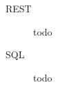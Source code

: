 \chapter*{\nameofglossary}


\begin{description}
	\item[REST] todo
	\item[SQL] todo
\end{description}

